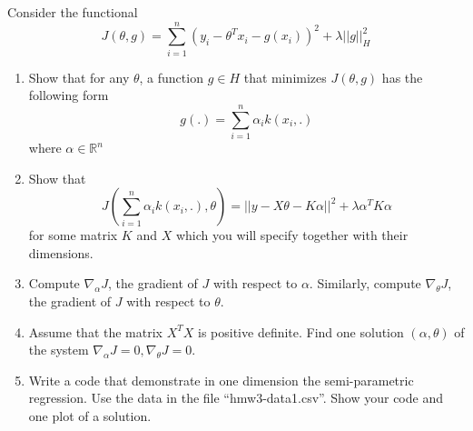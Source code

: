 \documentclass[11pt]{article}
\begin{document}
Consider the functional 
\begin{equation}
J(\theta,g) = \sum_{i=1}^n \left(y_i - \theta^T x_i - g(x_i)\right)^2 + \lambda ||g||_H^2
\end{equation}
\begin{enumerate}
\item 
Show that for any $\theta$, a function $g \in H$ that minimizes $J(\theta,g)$ has the following form 
\begin{equation}
g(.)=\sum_{i=1}^n \alpha_i k(x_i,.)
\end{equation}
where $\alpha \in \mathbb{R}^n$ 
\item 
Show that 
\begin{equation}
J(\sum_{i=1}^n \alpha_i k(x_i,.),\theta)=||y - X\theta - K\alpha||^2 + \lambda \alpha^T K \alpha
\end{equation}
for some matrix $K$ and $X$ which you will specify together with their dimensions. 
\item Compute $\nabla_\alpha J$, the gradient of $J$ with respect to $\alpha$. Similarly, compute $\nabla_\theta J$, the gradient of $J$ with respect to $\theta$. 
\item Assume that the matrix $X^TX$ is positive definite.
Find one solution $(\alpha,\theta)$ of the system  $\nabla_\alpha J=0, \nabla_\theta J=0$.  
\item 
Write a code that demonstrate in one dimension the semi-parametric regression. Use the data in the file ``hmw3-data1.csv''. Show your code and one plot of a solution.  
\end{enumerate}
\end{document}
